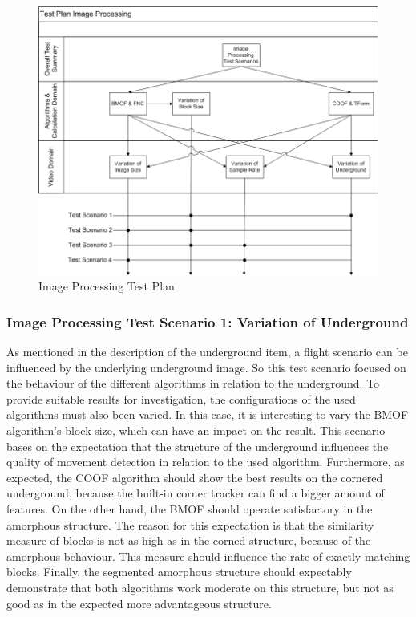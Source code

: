 \begin{figure}[H]
	\centering
		\includegraphics[width=1\textwidth]{graphic/TestPlanOpticalFlow.png}
	\caption{Image Processing Test Plan}
	\label{fig:TestPlanOpticalFlow.png}
\end{figure}

\subsubsection{Image Processing Test Scenario 1: Variation of Underground}
As mentioned in the description of the underground item, a flight scenario can be influenced by the underlying underground image. So this test scenario focused on the behaviour of the different algorithms in relation to the underground. To provide suitable results for investigation, the configurations of the used algorithms must also been varied. In this case, it is interesting to vary the \gls{BMOF} algorithm's block size, which can have an impact on the result.
This scenario bases on the expectation that the structure of the underground influences the quality of movement detection in relation to the used algorithm. Furthermore, as expected, the \gls{COOF} algorithm should show the best results on the cornered underground, because the built-in corner tracker can find a bigger amount of features. On the other hand, the \gls{BMOF} should operate satisfactory in the amorphous structure. The reason for this expectation is that the similarity measure of blocks is not as high as in the corned structure, because of the amorphous behaviour. This measure should influence the rate of exactly matching blocks. Finally, the segmented amorphous structure should expectably demonstrate that both algorithms work moderate on this structure, but not as good as in the expected more advantageous structure.

